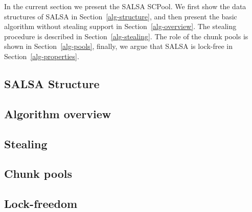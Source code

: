 In the current section we present the SALSA SCPool. We first show the data structures of SALSA in Section~\ref{alg-structure}, and then present the basic algorithm without stealing support in Section~\ref{alg-overview}. The stealing procedure is described in Section~\ref{alg-stealing}. The role of the chunk pools is shown in Section~\ref{alg-pools}, finally, we argue that SALSA is lock-free in Section~\ref{alg-properties}. 

\subsection{SALSA Structure\label{alg-structure}}

\subsection{Algorithm overview\label{alg-overview}}

\subsection{Stealing\label{alg-stealing}}

\subsection{Chunk pools\label{alg-pools}}

\subsection{Lock-freedom\label{alg-properties}}

